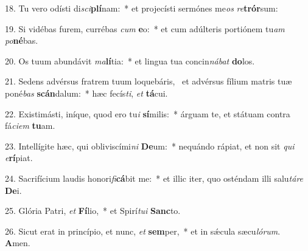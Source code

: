 18. Tu vero odísti di\textit{sci}\textbf{plí}nam:~*  et projecísti sermónes me\textit{os} \textit{re}\textbf{trór}sum:\

19. Si vidébas furem, currébas \textit{cum} \textbf{e}o:~*  et cum adúlteris portiónem tu\textit{am} \textit{po}\textbf{né}bas.\

20. Os tuum abundávit \textit{ma}\textbf{lí}tia:~*  et lingua tua concin\textit{ná}\textit{bat} \textbf{do}los.\

21. Sedens advérsus fratrem tuum loquebáris, \dag\  et advérsus fílium matris tuæ poné\textit{bas} \textbf{scán}dalum:~*  hæc fecís\textit{ti}, \textit{et} \textbf{tá}cui.\

22. Existimásti, iníque, quod ero tu\textit{i} \textbf{sí}milis:~*  árguam te, et státuam contra fá\textit{ci}\textit{em} \textbf{tu}am.\

23. Intellígite hæc, qui obliviscími\textit{ni} \textbf{De}um:~*  nequándo rápiat, et non sit \textit{qui} \textit{e}\textbf{rí}piat.\

24. Sacrifícium laudis honori\textit{fi}\textbf{cá}bit me:~*  et illic iter, quo osténdam illi salu\textit{tá}\textit{re} \textbf{De}i.\

25. Glória Patri, \textit{et} \textbf{Fí}lio,~*  et Spirí\textit{tu}\textit{i} \textbf{Sanc}to.\

26. Sicut erat in princípio, et nunc, \textit{et} \textbf{sem}per,~*  et in sǽcula sæcu\textit{ló}\textit{rum}. \textbf{A}men.\

